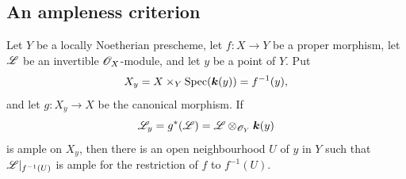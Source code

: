\subsection{An ampleness criterion}
\label{subsection:III.4.7}

\begin{theorem}[4.7.1]
\label{III.4.7.1}
Let $Y$ be a locally Noetherian prescheme, let $f:X\to Y$ be a
proper morphism, let $\mathscr{L}$ be an invertible $\mathscr{O}_X$-module,
and let $y$ be a point of $Y$.  Put
\[
  X_y=X\times_Y\operatorname{Spec}(\boldsymbol{k}(y))=f^{-1}(y),
\]
and let $g:X_y\to X$ be the canonical morphism.  If
\[
  \mathscr{L}_y=g^*(\mathscr{L})
  =\mathscr{L}\otimes_{\mathscr{O}_Y}\boldsymbol{k}(y)
\]
is ample on $X_y$, then there is an open neighbourhood $U$ of $y$
in $Y$ such that $\mathscr{L}|_{f^{-1}(U)}$ is ample for the restriction
of $f$ to $f^{-1}(U)$.
\end{theorem}

